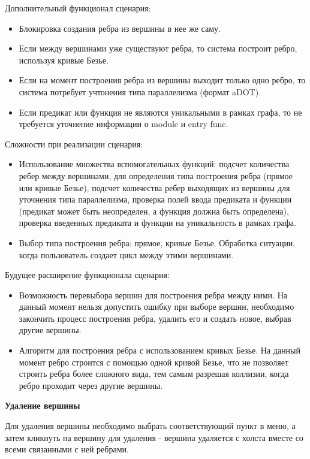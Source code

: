 Дополнительный функционал сценария:
\begin{itemize}
	\item Блокировка создания ребра из вершины в нее же саму.
	\item Если между вершинами уже существуют ребра, то система построит ребро, используя кривые Безье.
	\item Если на момент построения ребра из вершины выходит только одно ребро, то система потребует учтонения типа параллелизма (формат aDOT).
	\item Если предикат или функция не являются уникальными в рамках графа, то не требуется уточнение информации о module и entry func.
\end{itemize}

Сложности при реализации сценария:
\begin{itemize}
	\item Использование множества вспомогательных функций: подсчет количества ребер между вершинами, для определения типа построения ребра (прямое или кривые Безье), подсчет количества ребер выходящих из вершины для уточнения типа параллелизма, проверка полей ввода предиката и функции (предикат может быть неопределен, а функция должна быть определена), проверка введенных предиката и функции на уникальность в рамках графа.
	\item Выбор типа построения ребра: прямое, кривые Безье. Обработка ситуации, когда пользователь создает цикл между этими вершинами.
\end{itemize}

Будущее расширение функционала сценария:
\begin{itemize}
	\item Возможность перевыбора вершин для построения ребра между ними. На данный момент нельзя допустить ошибку при выборе вершин, необходимо закончить процесс построения ребра, удалить его и создать новое, выбрав другие вершины.
	\item Алгоритм для построения ребра с использованием кривых Безье. На данный момент ребро строится с помощью одной кривой Безье, что не позволяет строить ребра более сложного вида, тем самым разрешая коллизии, когда ребро проходит через другие вершины.
\end{itemize}

\textbf{Удаление вершины}

Для удаления вершины необходимо выбрать соответствующий пункт в меню, а затем кликнуть на вершину для удаления - вершина удаляется с холста вместе со всеми связанными с ней ребрами.


